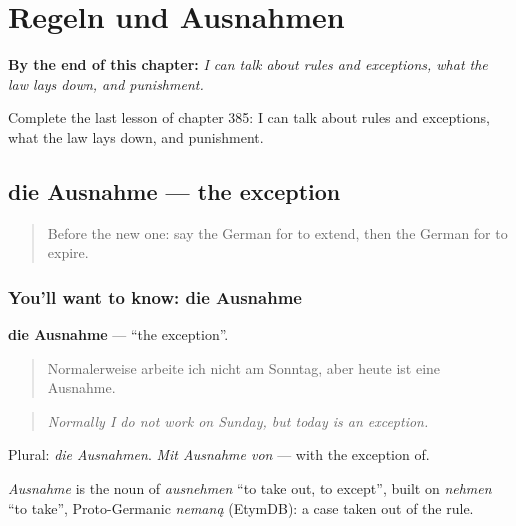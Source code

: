 
\chapter{Regeln und Ausnahmen}
\label{ch:ge-regeln-und-ausnahmen}

\begin{chapteropening}
\textbf{By the end of this chapter:} \emph{I can talk about rules and exceptions, what the law lays down, and punishment.}

Complete the last lesson of chapter 385: I can talk about rules and exceptions, what the law lays down, and punishment.
\end{chapteropening}

\section[die Ausnahme]{die Ausnahme — the exception}

\label{lesson:GE-C385-ausnahme}



\begin{quote}
Before the new one: say the German for to extend, then the German for to expire.
\end{quote}

\subsection*{You'll want to know: die Ausnahme}
\textbf{die Ausnahme} — \textquotedblleft{}the exception\textquotedblright{}.

\begin{quote}
Normalerweise arbeite ich nicht am Sonntag, aber heute ist eine Ausnahme.
\end{quote}

\begin{quote}
\emph{Normally I do not work on Sunday, but today is an exception.}
\end{quote}

Plural: \emph{die Ausnahmen}. \emph{Mit Ausnahme von} — with the exception of.

\begin{cousinweb}
\emph{Ausnahme} is the noun of \emph{ausnehmen} \textquotedblleft{}to take out, to except\textquotedblright{}, built on \emph{nehmen} \textquotedblleft{}to take\textquotedblright{}, Proto-Germanic \emph{nemaną} (EtymDB): a case taken out of the rule.
\end{cousinweb}

